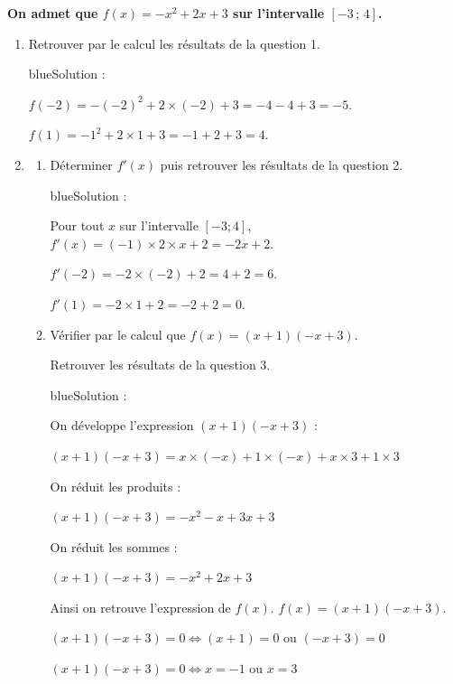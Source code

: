 \textbf{On admet que $f(x)=-x^2+2x+3$ sur l'intervalle $[-3\,;\,4]$.}
\begin{enumerate}[start=5]
\item Retrouver par le calcul les résultats de la question 1.

\begin{color}{blue}Solution :\par
$f(-2)=-(-2)^2+2\times(-2)+3 = -4 - 4 + 3 = -5$.

$f(1)=-1^2+2\times 1 +3 = -1  + 2 + 3 = 4$.
\end{color}

\item
\begin{enumerate}[label=\alph*)]
\item Déterminer $f'(x)$ puis retrouver les résultats de la question 2.

\begin{color}{blue}Solution :\par
Pour tout $x$ sur l'intervalle $[-3;4]$, $f'(x) = (-1) \times 2\times x + 2 = -2x+2 $.

$f'(-2)=-2\times (-2) + 2  = 4 + 2 = 6$.

$f'(1)=-2\times 1 + 2  = -2 + 2 = 0$.



\end{color}

\item Vérifier par le calcul que $f(x)=(x+1)(-x+3)$.\par Retrouver les résultats de la question 3.

\begin{color}{blue}Solution :\par
On développe l'expression $(x+1)(-x+3)$ :

$(x+1)(-x+3) = x\times(-x) + 1\times (-x) +x\times 3 + 1\times 3$

On réduit les produits :

$(x+1)(-x+3) = -x^2 - x + 3x + 3$

On réduit les sommes :

$(x+1)(-x+3) = -x^2 + 2x + 3$

Ainsi on retrouve l'expression de $f(x)$. $f(x)=(x+1)(-x+3)$.

$(x+1)(-x+3) = 0 \iff (x+1) = 0 \text{ ou } (-x+3) = 0 $

$(x+1)(-x+3) = 0 \iff x = -1 \text{ ou } x = 3 $
\end{color}




\end{enumerate}
\end{enumerate}
